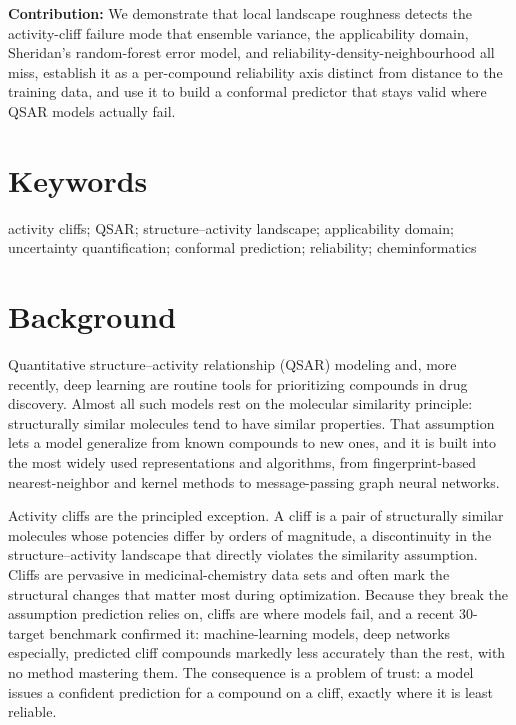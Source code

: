 \documentclass[11pt,letterpaper]{article}
\begin{document}
\noindent\textbf{Contribution:} We demonstrate that local landscape roughness detects the activity-cliff failure mode that ensemble variance, the applicability domain, Sheridan's random-forest error model, and reliability-density-neighbourhood all miss, establish it as a per-compound reliability axis distinct from distance to the training data, and use it to build a conformal predictor that stays valid where QSAR models actually fail.

\section*{Keywords}
activity cliffs; QSAR; structure--activity landscape; applicability domain; uncertainty quantification; conformal prediction; reliability; cheminformatics

\section*{Background}

Quantitative structure--activity relationship (QSAR) modeling and, more recently, deep learning are routine tools for prioritizing compounds in drug discovery.\cite{vamathevan2019,walters2021} Almost all such models rest on the molecular similarity principle: structurally similar molecules tend to have similar properties.\cite{johnson1990} That assumption lets a model generalize from known compounds to new ones, and it is built into the most widely used representations and algorithms, from fingerprint-based nearest-neighbor and kernel methods to message-passing graph neural networks.

Activity cliffs are the principled exception.\cite{maggiora2006,stumpfe2012} A cliff is a pair of structurally similar molecules whose potencies differ by orders of magnitude, a discontinuity in the structure--activity landscape that directly violates the similarity assumption. Cliffs are pervasive in medicinal-chemistry data sets and often mark the structural changes that matter most during optimization.\cite{cruzmonteagudo2014} Because they break the assumption prediction relies on, cliffs are where models fail, and a recent 30-target benchmark confirmed it: machine-learning models, deep networks especially, predicted cliff compounds markedly less accurately than the rest, with no method mastering them.\cite{vantilborg2022,dablander2023} The consequence is a problem of trust: a model issues a confident prediction for a compound on a cliff, exactly where it is least reliable.
\end{document}
